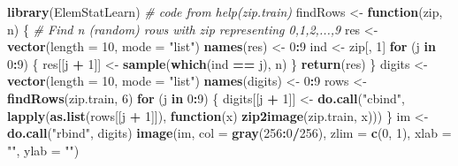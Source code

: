 \documentclass[]{article}
\newenvironment{Shaded}{\begin{snugshade}}{\end{snugshade}}
\newcommand{\KeywordTok}[1]{\textcolor[rgb]{0.13,0.29,0.53}{\textbf{#1}}}
\newcommand{\DataTypeTok}[1]{\textcolor[rgb]{0.13,0.29,0.53}{#1}}
\newcommand{\DecValTok}[1]{\textcolor[rgb]{0.00,0.00,0.81}{#1}}
\newcommand{\StringTok}[1]{\textcolor[rgb]{0.31,0.60,0.02}{#1}}
\newcommand{\CommentTok}[1]{\textcolor[rgb]{0.56,0.35,0.01}{\textit{#1}}}
\newcommand{\ControlFlowTok}[1]{\textcolor[rgb]{0.13,0.29,0.53}{\textbf{#1}}}
\newcommand{\OperatorTok}[1]{\textcolor[rgb]{0.81,0.36,0.00}{\textbf{#1}}}
\newcommand{\NormalTok}[1]{#1}
\begin{document}
\begin{Shaded}
\begin{Highlighting}[]
\KeywordTok{library}\NormalTok{(ElemStatLearn)}
\CommentTok{# code from help(zip.train)}
\NormalTok{findRows <-}\StringTok{ }\ControlFlowTok{function}\NormalTok{(zip, n) \{}
    \CommentTok{# Find n (random) rows with zip representing 0,1,2,...,9}
\NormalTok{    res <-}\StringTok{ }\KeywordTok{vector}\NormalTok{(}\DataTypeTok{length =} \DecValTok{10}\NormalTok{, }\DataTypeTok{mode =} \StringTok{"list"}\NormalTok{)}
    \KeywordTok{names}\NormalTok{(res) <-}\StringTok{ }\DecValTok{0}\OperatorTok{:}\DecValTok{9}
\NormalTok{    ind <-}\StringTok{ }\NormalTok{zip[, }\DecValTok{1}\NormalTok{]}
    \ControlFlowTok{for}\NormalTok{ (j }\ControlFlowTok{in} \DecValTok{0}\OperatorTok{:}\DecValTok{9}\NormalTok{) \{}
\NormalTok{        res[[j }\OperatorTok{+}\StringTok{ }\DecValTok{1}\NormalTok{]] <-}\StringTok{ }\KeywordTok{sample}\NormalTok{(}\KeywordTok{which}\NormalTok{(ind }\OperatorTok{==}\StringTok{ }\NormalTok{j), n)}
\NormalTok{    \}}
    \KeywordTok{return}\NormalTok{(res)}
\NormalTok{\}}
\NormalTok{digits <-}\StringTok{ }\KeywordTok{vector}\NormalTok{(}\DataTypeTok{length =} \DecValTok{10}\NormalTok{, }\DataTypeTok{mode =} \StringTok{"list"}\NormalTok{)}
\KeywordTok{names}\NormalTok{(digits) <-}\StringTok{ }\DecValTok{0}\OperatorTok{:}\DecValTok{9}
\NormalTok{rows <-}\StringTok{ }\KeywordTok{findRows}\NormalTok{(zip.train, }\DecValTok{6}\NormalTok{)}
\ControlFlowTok{for}\NormalTok{ (j }\ControlFlowTok{in} \DecValTok{0}\OperatorTok{:}\DecValTok{9}\NormalTok{) \{}
\NormalTok{    digits[[j }\OperatorTok{+}\StringTok{ }\DecValTok{1}\NormalTok{]] <-}\StringTok{ }\KeywordTok{do.call}\NormalTok{(}\StringTok{"cbind"}\NormalTok{, }\KeywordTok{lapply}\NormalTok{(}\KeywordTok{as.list}\NormalTok{(rows[[j }\OperatorTok{+}\StringTok{ }\DecValTok{1}\NormalTok{]]), }
        \ControlFlowTok{function}\NormalTok{(x) }\KeywordTok{zip2image}\NormalTok{(zip.train, x)))}
\NormalTok{\}}
\NormalTok{im <-}\StringTok{ }\KeywordTok{do.call}\NormalTok{(}\StringTok{"rbind"}\NormalTok{, digits)}
\KeywordTok{image}\NormalTok{(im, }\DataTypeTok{col =} \KeywordTok{gray}\NormalTok{(}\DecValTok{256}\OperatorTok{:}\DecValTok{0}\OperatorTok{/}\DecValTok{256}\NormalTok{), }\DataTypeTok{zlim =} \KeywordTok{c}\NormalTok{(}\DecValTok{0}\NormalTok{, }\DecValTok{1}\NormalTok{), }\DataTypeTok{xlab =} \StringTok{""}\NormalTok{, }\DataTypeTok{ylab =} \StringTok{""}\NormalTok{)}
\end{Highlighting}
\end{Shaded}
\end{document}

